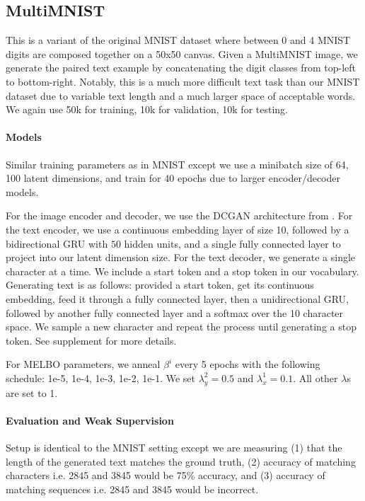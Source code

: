 \documentclass{article}
\begin{document}
\subsection{MultiMNIST}

This is a variant of the original MNIST dataset where between 0 and 4 MNIST digits are composed together on a 50x50 canvas. Given a MultiMNIST image, we generate the paired text example by concatenating the digit classes from top-left to bottom-right. Notably, this is a much more difficult text task than our MNIST dataset due to variable text length and a much larger space of acceptable words. We again use 50k for training, 10k for validation, 10k for testing.

\paragraph{Models} Similar training parameters as in MNIST except we use a minibatch size of 64, 100 latent dimensions, and train for 40 epochs due to larger encoder/decoder models.

For the image encoder and decoder, we use the DCGAN architecture from \cite{radford2015unsupervised}. For the text encoder, we use a continuous embedding layer of size 10, followed by a bidirectional GRU with $50$ hidden units, and a single fully connected layer to project into our latent dimension size. For the text decoder, we generate a single character at a time. We include a start token and a stop token in our vocabulary. Generating text is as follows: provided a start token, get its continuous embedding, feed it through a fully connected layer, then a unidirectional GRU, followed by another fully connected layer and a softmax over the 10 character space. We sample a new character and repeat the process until generating a stop token. See supplement for more details.

For MELBO parameters, we anneal $\beta^{i}$ every 5 epochs with the following schedule: 1e-5, 1e-4, 1e-3, 1e-2, 1e-1. We set $\lambda_{y}^{2} = 0.5$ and $\lambda_{x}^{1} = 0.1$. All other $\lambda$s are set to 1.

\paragraph{Evaluation and Weak Supervision} Setup is identical to the MNIST setting except we are measuring (1) that the length of the generated text matches the ground truth, (2) accuracy of matching characters i.e. 2845 and 3845 would be 75\% accuracy, and (3) accuracy of matching sequences i.e. 2845 and 3845 would be incorrect.
\end{document}
